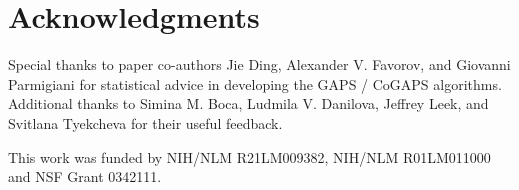 \documentclass{report}
\begin{document}
\chapter{Acknowledgments}

\par Special thanks to paper co-authors Jie Ding, Alexander V. Favorov, and Giovanni Parmigiani for statistical advice in developing the GAPS / CoGAPS algorithms.  Additional thanks to Simina M. Boca, Ludmila V. Danilova, Jeffrey Leek, and Svitlana Tyekcheva for their useful feedback.

\par This work was funded by NIH/NLM R21LM009382, NIH/NLM R01LM011000 and NSF Grant 0342111. 



\end{document}
